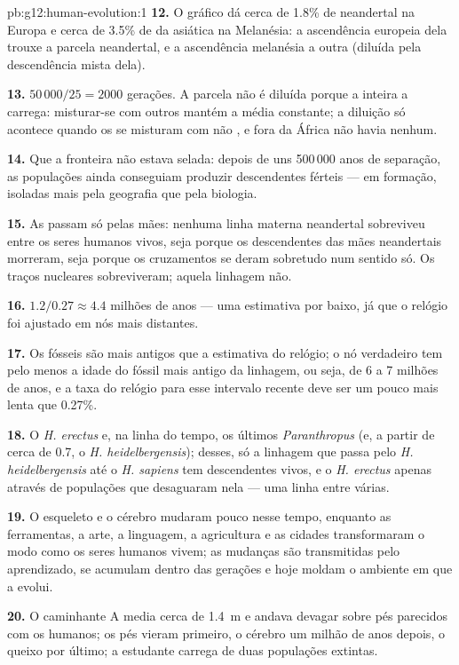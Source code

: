 \begin{solution}{pb:g12:human-evolution:1}
\textbf{12.} O gráfico dá cerca de 1.8\% de neandertal na Europa e
cerca de 3.5\% de  da  asiática na Melanésia: a ascendência
europeia dela trouxe a parcela neandertal, e a ascendência melanésia a
outra (diluída pela descendência mista dela).

\textbf{13.} $50\,000/25 = 2000$ gerações. A parcela não é diluída
porque a  inteira a carrega: misturar-se com outros 
mantém a média constante; a diluição só acontece quando os 
se misturam com não , e fora da África não havia nenhum.

\textbf{14.} Que a fronteira não estava selada: depois de uns 500\,000
anos de separação, as populações ainda conseguiam produzir descendentes
férteis ---  em formação, isoladas mais pela geografia que pela
biologia.

\textbf{15.} As  passam só pelas mães: nenhuma linha
materna neandertal sobreviveu entre os seres humanos vivos, seja porque
os descendentes das mães neandertais morreram, seja porque os
cruzamentos se deram sobretudo num sentido só. Os traços nucleares
sobreviveram; aquela linhagem não.

\textbf{16.} $1.2/0.27 \approx 4.4$ milhões de anos --- uma estimativa
por baixo, já que o relógio foi ajustado em nós mais distantes.

\textbf{17.} Os fósseis são mais antigos que a estimativa do relógio; o
nó verdadeiro tem pelo menos a idade do fóssil mais antigo da linhagem,
ou seja, de 6 a 7 milhões de anos, e a taxa do relógio para esse
intervalo recente deve ser um pouco mais lenta que 0.27\%.

\textbf{18.} O \emph{H. erectus} e, na linha do tempo, os últimos
\emph{Paranthropus} (e, a partir de cerca de 0.7, o
\emph{H. heidelbergensis}); desses, só a linhagem que passa pelo
\emph{H. heidelbergensis} até o \emph{H. sapiens} tem descendentes
vivos, e o \emph{H. erectus} apenas através de populações que
desaguaram nela --- uma linha entre várias.

\textbf{19.} O esqueleto e o cérebro mudaram pouco nesse tempo,
enquanto as ferramentas, a arte, a linguagem, a agricultura e as
cidades transformaram o modo como os seres humanos vivem; as mudanças
são transmitidas pelo aprendizado, se acumulam dentro das gerações e
hoje moldam o ambiente em que a  evolui.

\textbf{20.} O caminhante A media cerca de \qty{1.4}{m} e andava
devagar sobre pés parecidos com os humanos; os pés vieram primeiro, o
cérebro um milhão de anos depois, o queixo por último; a estudante
carrega  de duas populações extintas.
\end{solution}
